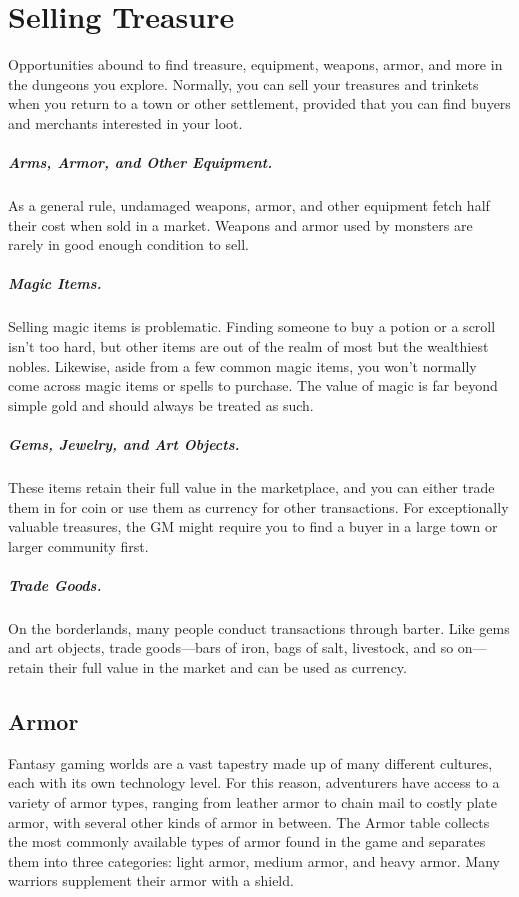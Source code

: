 \section{Selling Treasure}

Opportunities abound to find treasure, equipment, weapons, armor, and more in the dungeons you explore. Normally, you can sell your treasures and trinkets when you return to a town or other settlement, provided that you can find buyers and merchants interested in your loot.

\subparagraph*{Arms, Armor, and Other Equipment.} As a general rule, undamaged weapons, armor, and other equipment fetch half their cost when sold in a market. Weapons and armor used by monsters are rarely in good enough condition to sell.

\subparagraph*{Magic Items.} Selling magic items is problematic. Finding someone to buy a potion or a scroll isn't too hard, but other items are out of the realm of most but the wealthiest nobles. Likewise, aside from a few common magic items, you won't normally come across magic items or spells to purchase. The value of magic is far beyond simple gold and should always be treated as such.

\subparagraph*{Gems, Jewelry, and Art Objects.} These items retain their full value in the marketplace, and you can either trade them in for coin or use them as currency for other transactions. For exceptionally valuable treasures, the GM might require you to find a buyer in a large town or larger community first.

\subparagraph*{Trade Goods.} On the borderlands, many people conduct transactions through barter. Like gems and art objects, trade goods—bars of iron, bags of salt, livestock, and so on—retain their full value in the market and can be used as currency.

\subsection{Armor}

Fantasy gaming worlds are a vast tapestry made up of many different cultures, each with its own technology level. For this reason, adventurers have access to a variety of armor types, ranging from leather armor to chain mail to costly plate armor, with several other kinds of armor in between. The Armor table collects the most commonly available types of armor found in the game and separates them into three categories: light armor, medium armor, and heavy armor. Many warriors supplement their armor with a shield.


